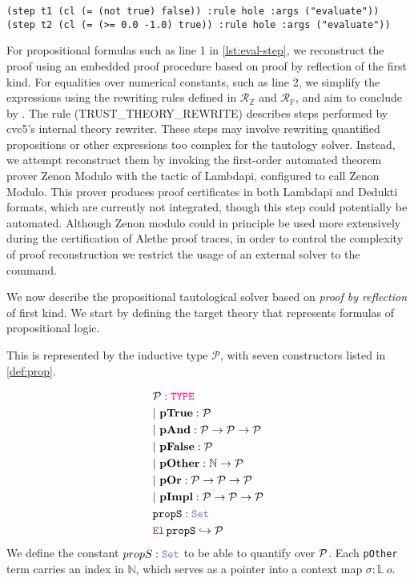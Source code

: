 \smallskip

\begin{lstlisting}[language=SMT,caption={An example of proof trace using the cvc5 $\kw{evaluate}$ rule.},label={lst:eval-step}]
(step t1 (cl (= (not true) false)) :rule hole :args ("evaluate"))
(step t2 (cl (= (>= 0.0 -1.0) true)) :rule hole :args ("evaluate"))
\end{lstlisting}

\smallskip

For propositional formulas such as line 1 in \cref{lst:eval-step}, we reconstruct the proof using an embedded proof procedure based on proof by reflection of the first kind.
For equalities over numerical constants, such as line 2, we simplify the expressions using the rewriting rules defined in $\mathcal{R}_{\mathbb{Z}}$ and $\mathcal{R}_{\mathbb{P}}$, and aim to conclude by .
The rule  (TRUST\_THEORY\_REWRITE) describes steps performed by cvc5’s internal theory rewriter.
These steps may involve rewriting quantified propositions or other expressions too complex for the tautology solver.
Instead, we attempt reconstruct them by invoking the first-order automated theorem prover Zenon Modulo \cite{zenonmodulo} with the tactic  of Lambdapi, configured to call Zenon Modulo.
This prover produces proof certificates in both Lambdapi and Dedukti formats, which are currently not integrated,  though this step could potentially be automated.
Although Zenon modulo could in principle be used more extensively during the certification of Alethe proof traces, in order to control the complexity of proof reconstruction we restrict the usage of an external solver to the  command.

We now describe the propositional tautological solver based on \emph{proof by reflection} of first kind.
We start by defining the target theory that represents formulas of propositional logic.

\begin{definition}[$\cal{P}$]\label{def:prop}
This is represented by the inductive type $\mathcal{P}$, with seven constructors listed in \cref{def:prop}.

\begin{align*}
& \cal{P} : \type \\
& |~\textbf{pTrue} : \cal{P} \\
& |~\textbf{pAnd} : \cal{P} \ra \cal{P} \ra \cal{P} \\
& |~\textbf{pFalse} : \cal{P} \\
& |~\textbf{pOther} : \N \ra \cal{P} \\
& |~\textbf{pOr} : \cal{P} \ra \cal{P} \ra \cal{P} \\
& |~\textbf{pImpl} : \cal{P} \ra \cal{P} \ra \cal{P} \\
& \kw{propS}: \set \\
& \el\,\kw{propS} \re \cal{P}
\end{align*}
We define the constant $propS: \set$ to be able to quantify over $\cal{P}$.
Each \texttt{pOther} term carries an index in $\mathbb{N}$, which serves as a pointer into a context map $\sigma : \mathbb{L}~o$.
\end{definition}

